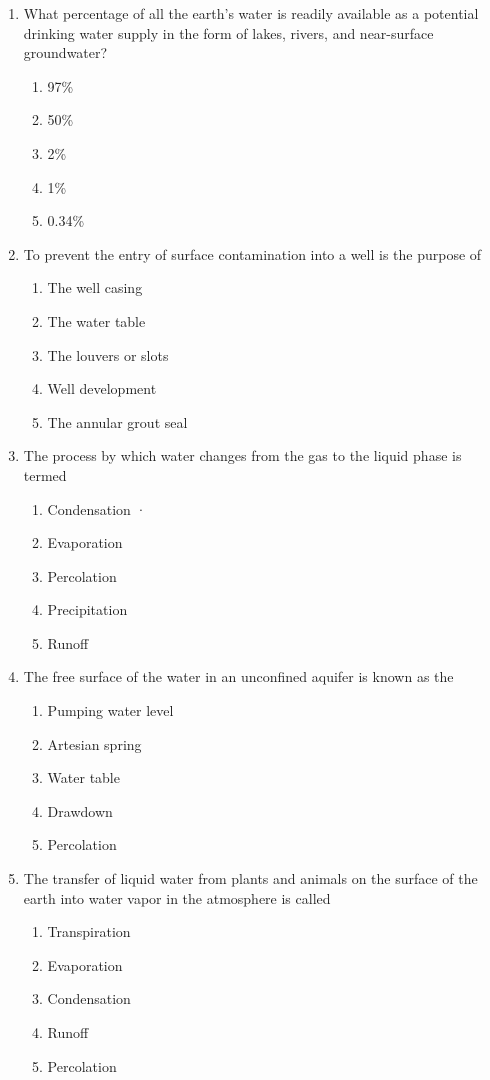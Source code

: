 \begin{enumerate}
\item What percentage of all the earth's water is readily available as a potential drinking water supply in the form of lakes, rivers, and near-surface groundwater?
\begin{enumerate}
\item 97\%
\item 50\%
\item 2\%
\item 1\%
\item 0.34\%
\end{enumerate}

\item To  prevent the entry of surface contamination into a well is the purpose of
\begin{enumerate}
\item The well casing
\item The water table
\item The louvers or slots
\item Well development
\item The  annular grout seal	
\end{enumerate}

\item The process by which water changes from the gas to the liquid phase is termed
\begin{enumerate}
\item Condensation	·
\item Evaporation
\item Percolation
\item Precipitation
\item Runoff
\end{enumerate}

\item The free surface of the water in an unconfined aquifer is known as the
\begin{enumerate}
\item Pumping water level
\item Artesian spring
\item Water table
\item Drawdown
\item Percolation
\end{enumerate}

\item The transfer of liquid water from plants and animals on the surface of the earth into water vapor in the atmosphere is called
\begin{enumerate}
\item Transpiration
\item Evaporation
\item Condensation
\item Runoff
\item Percolation
\end{enumerate}


\end{enumerate}
